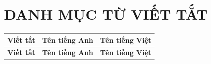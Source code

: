 \documentclass[../DoAn.tex]{subfiles}
\begin{document}
\chapter*{DANH MỤC TỪ VIẾT TẮT}
{}

\small
\setlength{\tabcolsep}{3pt}
\renewcommand{\arraystretch}{1.25}

\begin{longtable}{|>{\raggedright\arraybackslash}p{2.2cm}|>{\raggedright\arraybackslash}p{5.2cm}|>{\raggedright\arraybackslash}p{6cm}|}
    \hline
    \textbf{Viết tắt} & \textbf{Tên tiếng Anh} & \textbf{Tên tiếng Việt} \\
    \hline
    \endfirsthead

    \hline
    \textbf{Viết tắt} & \textbf{Tên tiếng Anh} & \textbf{Tên tiếng Việt} \\
    \hline
    \endhead


\end{longtable}
\end{document}
